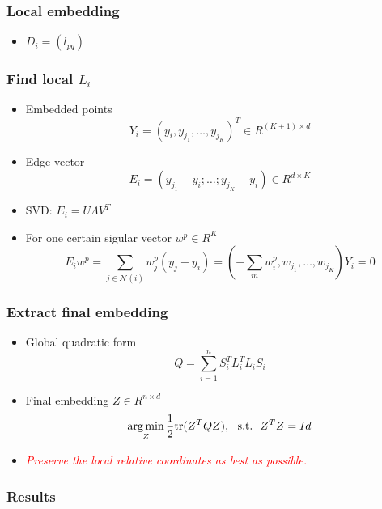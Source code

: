 \documentclass[serif,mathserif, 12pt]{beamer}
\newcommand{\TODO}[1]{\textcolor{red}{#1}}
\newcommand{\argmin}{\operatornamewithlimits{arg\min}}
\begin{document}
\begin{frame}
  \frametitle{Local embedding}
  \begin{itemize}
  \item $D_i = (l_{pq})$
  \end{itemize}
\end{frame}

\begin{frame}
  \frametitle{Find local $L_i$}
  \begin{itemize}
  \item Embedded points
    \begin{equation*}
      Y_i = (y_i, y_{j_1}, \dots, y_{j_K})^T \in R^{(K+1)\times d}
    \end{equation*}
  \item Edge vector
    \begin{equation*}
      E_i = (y_{j_1}-y_i; \dots; y_{j_K}-y_i) \in R^{d\times K}
    \end{equation*}
  \item SVD: $E_i = U\Lambda V^T$
  \item For one certain sigular vector $w^p \in R^K$
    \begin{equation*}
      E_i w^p = \sum_{j\in \mathcal{N}(i)} w^p_j(y_{j}-y_i) = (-\sum_m w^p_i, w_{j_1}, \dots, w_{j_K})Y_i = 0
    \end{equation*}
  \end{itemize}
\end{frame}

\begin{frame}
  \frametitle{Extract final embedding}
  \begin{itemize}
  \item Global quadratic form
    \begin{equation*}
      Q = \sum_{i = 1}^n S_i^TL_i^TL_iS_i
    \end{equation*}
  \item Final embedding $Z \in R^{n\times d}$
    \begin{equation*}
      \argmin_Z \frac{1}{2}\text{tr}(Z^TQZ), \text{~~s.t.~~} Z^TZ = Id
    \end{equation*}
  \item \emph{\TODO{Preserve the local relative coordinates as best as possible.}}
  \end{itemize}
\end{frame}

\begin{frame}
  \frametitle{Results}  
\end{frame}

\begin{frame} 
\end{frame}
\end{document}
